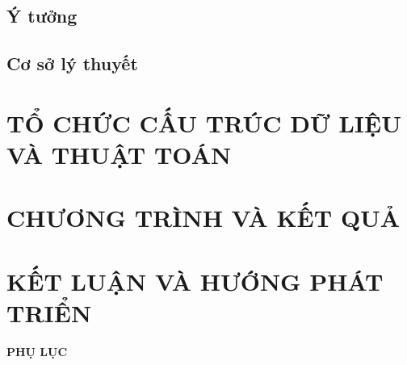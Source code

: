 \documentclass[a4paper]{article}
\begin{document}
	\subsection{Ý tưởng}
	
	\subsection{Cơ sở lý thuyết}
	
	
	\section{TỔ CHỨC CẤU TRÚC DỮ LIỆU VÀ THUẬT TOÁN}
	

    \section{CHƯƠNG TRÌNH VÀ KẾT QUẢ}
    
    
    \section{KẾT LUẬN VÀ HƯỚNG PHÁT TRIỂN}
    
	
	\appendix
	\renewcommand{\refname}{TÀI LIỆU THAM KHẢO}
	
	
	\newpage
	\begin{center}
		{\large \textbf{PHỤ LỤC}}
	\end{center}
	\changefontsizes{12pt}
	
	
\end{document}
